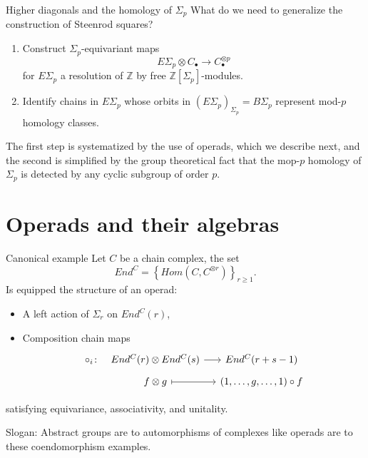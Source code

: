 \documentclass[10pt,t]{beamer}
\begin{document}
\begin{frame}{Higher diagonals and the homology of $\Sigma_p$}
	What do we need to generalize the construction of Steenrod squares?
	
	\pause \vspace{10pt}
	
	\begin{enumerate}
		\item Construct $\Sigma_p$-equivariant maps
		\begin{equation*}
		E\Sigma_p \otimes C_\bullet \to C_\bullet^{\otimes p}
		\end{equation*}
		for $E\Sigma_p$ a resolution of $\mathbb Z$ by free $\mathbb Z[\Sigma_p]$-modules.
		\vspace*{10pt} \pause
		\item Identify chains in $E\Sigma_p$ whose orbits in $(E\Sigma_p)_{\Sigma_p} = B\Sigma_p$ represent mod-$p$ homology classes.
	\end{enumerate}

	\vspace*{10pt}\pause

	The first step is systematized by the use of operads, which we describe next, and the second is simplified by the group theoretical fact that the mop-$p$ homology of $\Sigma_p$ is detected by any cyclic subgroup of order $p$.
\end{frame}


\section{Operads and their algebras}

\begin{frame}[fragile]{Canonical example}
	Let $C$ be a chain complex, the set
	\begin{equation*}
	End^C = \left\{Hom(C, C^{\otimes r})\right\}_{r \geq 1}.
	\end{equation*}
	Is equipped the structure of an operad:
	\begin{itemize}
		\item A left action of $\Sigma_r$ on $End^C(r)$,
		\item Composition chain maps
		\begin{equation*}
		\begin{tikzcd}[column sep=small, row sep=tiny]
		\circ_i \colon &[-10pt] End^C(r) \otimes End^C(s) \arrow[r] & End^C(r+s-1) \\
		& f \otimes g \arrow[r, |->] & (1, \dots, g, \dots, 1) \circ f 
		\end{tikzcd}
		\end{equation*}
	\end{itemize}
	satisfying equivariance, associativity, and unitality.
	
	\pause \vspace*{10pt}
	
	\textcolor{pblue}{Slogan:} Abstract groups are to automorphisms of complexes like operads are to these coendomorphism examples.
\end{frame}
\end{document}
